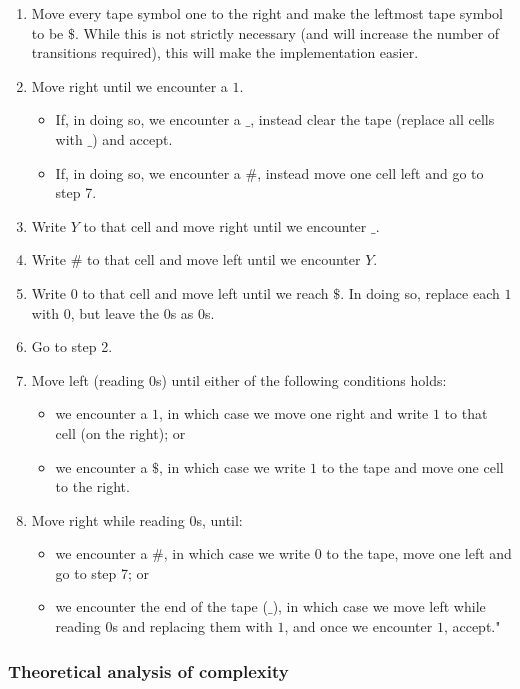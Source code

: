\begin{enumerate}
    \item Move every tape symbol one to the right and make the leftmost tape symbol to be $\$$. While this is not strictly necessary (and will increase the number of transitions required), this will make the implementation easier. 
    \item Move right until we encounter a $1$. 
        \begin{itemize}
            \item If, in doing so, we encounter a $\_$, instead clear the tape (replace all cells with $\_$) and accept.
            \item If, in doing so, we encounter a $\#$, instead move one cell left and go to step 7.
        \end{itemize}
    \item Write $Y$ to that cell and move right until we encounter $\_$.
    \item Write $\#$ to that cell and move left until we encounter $Y$.
    \item Write $0$ to that cell and move left until we reach $\$$. In doing so, replace each $1$ with $0$, but leave the $0$s as $0$s.
    \item Go to step 2.
    \item Move left (reading $0$s) until either of the following conditions holds:
        \begin{itemize}
            \item we encounter a $1$, in which case we move one right and write $1$ to that cell (on the right); or 
            \item we encounter a $\$$, in which case we write $1$ to the tape and move one cell to the right.
        \end{itemize}
    \item Move right while reading $0$s, until:
    \begin{itemize}
        \item we encounter a $\#$, in which case we write $0$ to the tape, move one left and go to step 7; or
        \item we encounter the end of the tape ($\_$), in which case we move left while reading $0$s and replacing them with $1$, and once we encounter $1$, accept."
    \end{itemize}
\end{enumerate}

\subsubsection{Theoretical analysis of complexity}

